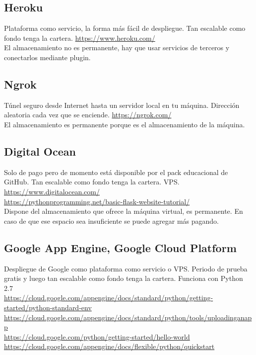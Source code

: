 \subsection{Heroku}
Plataforma como servicio, la forma más fácil de despliegue. Tan escalable como fondo tenga la cartera. \url{https://www.heroku.com/}\\

El almacenamiento no es permanente, hay que usar servicios de terceros y conectarlos mediante plugin.
\subsection{Ngrok}
Túnel seguro desde Internet hasta un servidor local en tu máquina. Dirección aleatoria cada vez que se enciende. \url{https://ngrok.com/}\\

El almacenamiento es permanente porque es el almacenamiento de la máquina.
\subsection{Digital Ocean}
Solo de pago pero de momento está disponible por el pack educacional de GitHub. Tan escalable como fondo tenga la cartera. VPS.\\ \url{https://www.digitalocean.com/}\\ \url{https://pythonprogramming.net/basic-flask-website-tutorial/}\\

Dispone del almacenamiento que ofrece la máquina virtual, es permanente. En caso de que ese espacio sea insuficiente se puede agregar más pagando.
\subsection{Google App Engine, Google Cloud Platform}
Despliegue de Google como plataforma como servicio o VPS. Periodo de prueba gratis y luego tan escalable como fondo tenga la cartera. Funciona con Python 2.7\\
\url{https://cloud.google.com/appengine/docs/standard/python/getting-started/python-standard-env}\\
\url{https://cloud.google.com/appengine/docs/standard/python/tools/uploadinganapp}\\
\url{https://cloud.google.com/python/getting-started/hello-world}\\
\url{https://cloud.google.com/appengine/docs/flexible/python/quickstart}\\


